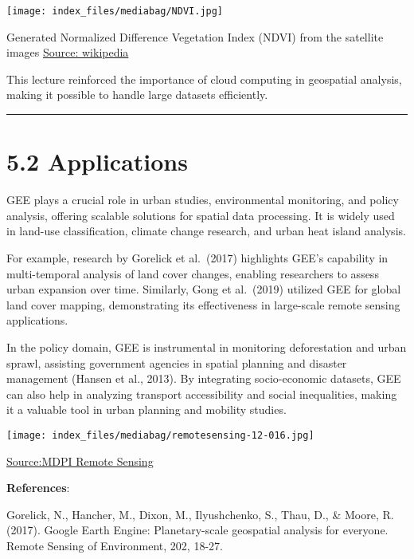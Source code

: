 \documentclass[
  letterpaper,
  DIV=11,
  numbers=noendperiod]{scrreprt}
\begin{document}
\texttt{[image: index\_files/mediabag/NDVI.jpg]}

Generated Normalized Difference Vegetation Index (NDVI) from the
satellite images
\href{https://upload.wikimedia.org/wikipedia/commons/a/ae/NDVI.jpg}{Source:
wikipedia}

This lecture reinforced the importance of cloud computing in geospatial
analysis, making it possible to handle large datasets efficiently.

\begin{center}\rule{0.5\linewidth}{0.5pt}\end{center}

\section{5.2 Applications}\label{applications-2}

GEE plays a crucial role in urban studies, environmental monitoring, and
policy analysis, offering scalable solutions for spatial data
processing. It is widely used in land-use classification, climate change
research, and urban heat island analysis.

For example, research by Gorelick et al.~(2017) highlights GEE's
capability in multi-temporal analysis of land cover changes, enabling
researchers to assess urban expansion over time. Similarly, Gong et
al.~(2019) utilized GEE for global land cover mapping, demonstrating its
effectiveness in large-scale remote sensing applications.

In the policy domain, GEE is instrumental in monitoring deforestation
and urban sprawl, assisting government agencies in spatial planning and
disaster management (Hansen et al., 2013). By integrating socio-economic
datasets, GEE can also help in analyzing transport accessibility and
social inequalities, making it a valuable tool in urban planning and
mobility studies.

\texttt{[image: index\_files/mediabag/remotesensing-12-016.jpg]}

\href{https://www.mdpi.com/remotesensing/remotesensing-12-01655/article_deploy/html/images/remotesensing-12-01655-g007-550.jpg}{Source:MDPI
Remote Sensing}

\textbf{References}:

Gorelick, N., Hancher, M., Dixon, M., Ilyushchenko, S., Thau, D., \&
Moore, R. (2017). Google Earth Engine: Planetary-scale geospatial
analysis for everyone. Remote Sensing of Environment, 202, 18-27.
\end{document}
